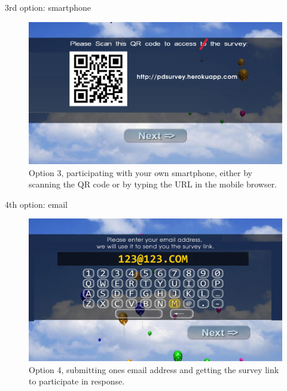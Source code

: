    3rd option: smartphone

    \begin{figure}
        \begin{center}
            \includegraphics[width=\columnwidth]{img/screenshots/option-smartphone.jpg}
        \end{center}
     \caption{Option 3, participating with your own smartphone, either by scanning the QR code or by typing the URL in the mobile browser.}
     \label{screenshot:smartphone-option}
    \end{figure}


    4th option: email

    \begin{figure}
        \begin{center}
            \includegraphics[width=\columnwidth]{img/screenshots/option-email.jpg}
        \end{center}
     \caption{Option 4, submitting ones email address and getting the survey link to participate in response.}
     \label{screenshot:email-option}
    \end{figure}